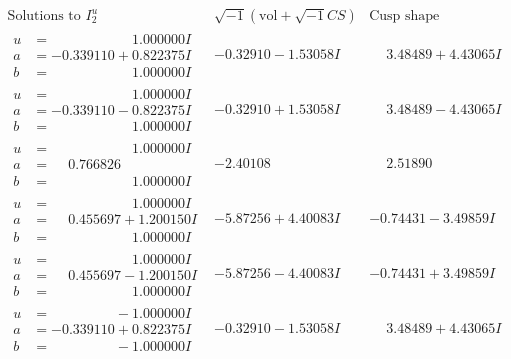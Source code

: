 \documentclass[1p]{elsarticle_modified}
\theoremstyle{definition}
\newcommand{\I}{\sqrt{-1}}
\begin{document}
$$\begin{array}{c|c|c}  
\text{Solutions to }I^u_{2}& \I (\text{vol} + \sqrt{-1}CS) & \text{Cusp shape}\\
 \hline 
\begin{aligned}
u &= \phantom{-0.000000 -}1.000000 I \\
a &= -0.339110 + 0.822375 I \\
b &= \phantom{-0.000000 -}1.000000 I\end{aligned}
 & -0.32910 - 1.53058 I & \phantom{-}3.48489 + 4.43065 I \\ \hline\begin{aligned}
u &= \phantom{-0.000000 -}1.000000 I \\
a &= -0.339110 - 0.822375 I \\
b &= \phantom{-0.000000 -}1.000000 I\end{aligned}
 & -0.32910 + 1.53058 I & \phantom{-}3.48489 - 4.43065 I \\ \hline\begin{aligned}
u &= \phantom{-0.000000 -}1.000000 I \\
a &= \phantom{-}0.766826\phantom{ +0.000000I} \\
b &= \phantom{-0.000000 -}1.000000 I\end{aligned}
 & -2.40108\phantom{ +0.000000I} & \phantom{-}2.51890\phantom{ +0.000000I} \\ \hline\begin{aligned}
u &= \phantom{-0.000000 -}1.000000 I \\
a &= \phantom{-}0.455697 + 1.200150 I \\
b &= \phantom{-0.000000 -}1.000000 I\end{aligned}
 & -5.87256 + 4.40083 I & -0.74431 - 3.49859 I \\ \hline\begin{aligned}
u &= \phantom{-0.000000 -}1.000000 I \\
a &= \phantom{-}0.455697 - 1.200150 I \\
b &= \phantom{-0.000000 -}1.000000 I\end{aligned}
 & -5.87256 - 4.40083 I & -0.74431 + 3.49859 I \\ \hline\begin{aligned}
u &= \phantom{-0.000000 } -1.000000 I \\
a &= -0.339110 + 0.822375 I \\
b &= \phantom{-0.000000 } -1.000000 I\end{aligned}
 & -0.32910 - 1.53058 I & \phantom{-}3.48489 + 4.43065 I \\ \hline\begin{aligned}

\end{aligned}
\end{array}$$
\end{document}

